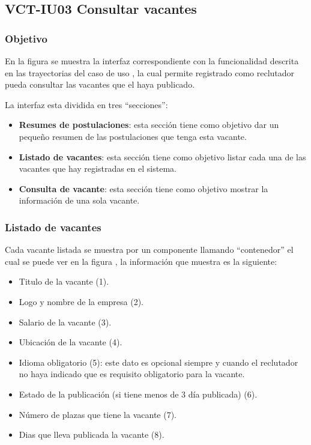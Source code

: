 \clearpage
\subsection{VCT-IU03 Consultar vacantes}

\subsubsection{Objetivo}
En la figura  se muestra la interfaz correspondiente con la funcionalidad descrita en las
trayectorias del caso de uso  , la cual permite registrado como reclutador pueda consultar las vacantes que el haya publicado.


La interfaz  esta dividida en tres ``secciones'':
\begin{itemize}
    \item \textbf{Resumes de postulaciones}: esta sección tiene como objetivo dar un pequeño resumen de las postulaciones que tenga esta vacante.
   \item \textbf{Listado de vacantes}: esta sección tiene como objetivo listar cada una de las vacantes que hay registradas en el sistema.
   \item \textbf{Consulta de vacante}: esta sección tiene como objetivo mostrar la información de una sola vacante.
\end{itemize}

\subsubsection{Listado de vacantes}
Cada vacante listada se muestra por un componente llamando ``contenedor'' el cual se puede ver en la figura , la información que 
muestra es la siguiente: 
\begin{itemize}
   \item Titulo de la vacante (1).
   \item Logo y nombre de la empresa (2).
   \item Salario de la vacante (3).
   \item Ubicación de la vacante (4).
   \item Idioma obligatorio (5): este dato es opcional siempre y cuando el reclutador no haya indicado que es requisito obligatorio 
   para la vacante.
   \item Estado de la publicación (si tiene menos de 3 día publicada) (6).
   \item Número de plazas que tiene la vacante (7).
   \item Dias que lleva publicada la vacante (8).
\end{itemize}

